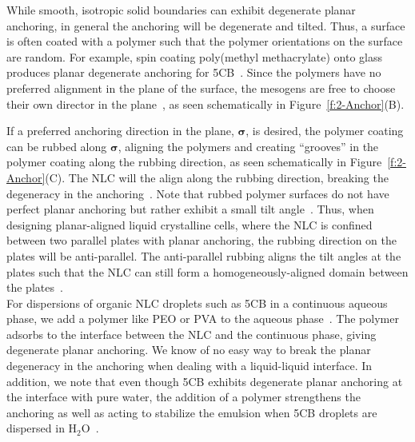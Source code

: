 While smooth, isotropic solid boundaries can exhibit degenerate planar anchoring, in general the anchoring will be degenerate and tilted.
Thus, a surface is often coated with a polymer such that the polymer orientations on the surface are random.
For example, spin coating poly(methyl methacrylate) onto glass produces planar degenerate anchoring for 5CB~\cite{syed2005planar}.
Since the polymers have no preferred alignment in the plane of the surface, the mesogens are free to choose their own director in the plane~\cite{RN313}, as seen schematically in Figure~\ref{f:2-Anchor}(B).

If a preferred anchoring direction in the plane, $\bm{\sigma}$, is desired, the polymer coating can be rubbed along $\bm{\sigma}$, aligning the polymers and creating ``grooves'' in the polymer coating along the rubbing direction, as seen schematically in Figure~\ref{f:2-Anchor}(C).
The NLC will the align along the rubbing direction, breaking the degeneracy in the anchoring~\cite{RN33,}.
Note that rubbed polymer surfaces do not have perfect planar anchoring but rather exhibit a small tilt angle~\cite{RN232}.
Thus, when designing planar-aligned liquid crystalline cells, where the NLC is confined between two parallel plates with planar anchoring, the rubbing direction on the plates will be anti-parallel.
The anti-parallel rubbing aligns the tilt angles at the plates such that the NLC can still form a homogeneously-aligned domain between the plates~\cite{RN232}. \\

For dispersions of organic NLC droplets such as 5CB in a continuous aqueous phase, we add a polymer like PEO or PVA to the aqueous phase~\cite{RN105,RN93}.
The polymer adsorbs to the interface between the NLC and the continuous phase, giving degenerate planar anchoring.
We know of no easy way to break the planar degeneracy in the anchoring when dealing with a liquid-liquid interface.
In addition, we note that even though 5CB exhibits degenerate planar anchoring at the interface with pure water, the addition of a polymer strengthens the anchoring as well as acting to stabilize the emulsion when 5CB droplets are dispersed in H$_2$O~\cite{RN105,RN93}.\\




